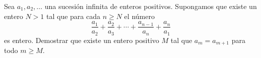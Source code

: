Sea $a_1, a_2, \dots$ una sucesión infinita de enteros positivos. Supongamos que existe un entero $N \gt 1$ tal que para cada $n \geq N$ el número
\[\frac{a_1}{a_2} + \frac{a_2}{a_3} + \cdots + \frac{a_{n-1}}{a_n} + \frac{a_n}{a_1}\]
es entero. Demostrar que existe un entero positivo $M$ tal que $a_m = a_{m+1}$ para todo $m \geq M$.